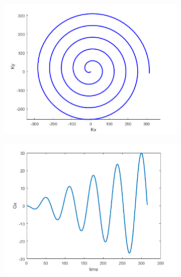 \documentclass[12pt]{article}
\begin{document}
\begin{figure}[H]
\begin{subfigure}{0.3\textwidth}
	
	\includegraphics[width=\textwidth]{Figures/SpiralK.png}
	\caption{}
	\label{Fig:spiralK}
\end{subfigure}
\begin{subfigure}{0.3\textwidth}
	
	\includegraphics[width=\textwidth]{Figures/SpiralGx.png}
	\caption{}
	\label{Fig:spiralGx}
\end{subfigure}
\begin{subfigure}{0.3\textwidth}
	

\end{subfigure}
\end{figure}
\end{document}
